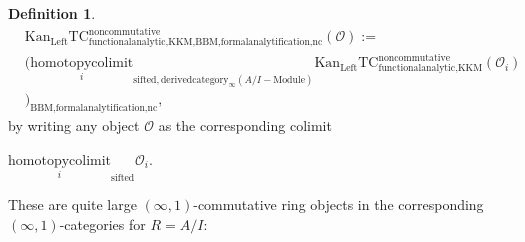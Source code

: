 \documentclass[11pt]{book}
\theoremstyle{definition}
\newtheorem{definition}[theorem]{Definition}
\numberwithin{equation}{section}
\begin{document}
\begin{definition}
\begin{align}
	&\mathrm{Kan}_{\mathrm{Left}}\mathrm{TC}^\mathrm{noncommutative}_{\text{functionalanalytic,KKM},\text{BBM,formalanalytification,nc}}(\mathcal{O}):=\\
	&(\underset{i}{\text{homotopycolimit}}_{\text{sifted},\text{derivedcategory}_{\infty}(A/I-\text{Module})}\mathrm{Kan}_{\mathrm{Left}}\mathrm{TC}^\mathrm{noncommutative}_{\text{functionalanalytic,KKM}}(\mathcal{O}_i)\\
	&)_\text{BBM,formalanalytification,nc},
\end{align}
by writing any object $\mathcal{O}$ as the corresponding colimit 
\begin{center}
$\underset{i}{\text{homotopycolimit}}_\text{sifted}\mathcal{O}_i$.
\end{center}
These are quite large $(\infty,1)$-commutative ring objects in the corresponding $(\infty,1)$-categories for $R=A/I$:


\end{definition}
\end{document}
